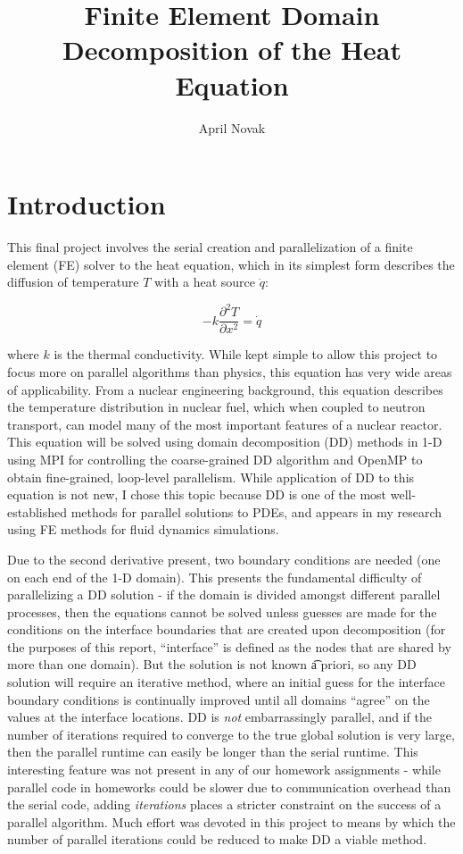 \documentclass[10pt]{article}
\title{Finite Element Domain Decomposition of the Heat Equation}
\author{April Novak}
\newcommand{\beq}{\begin{equation}}
\newcommand{\eeq}{\end{equation}}
\begin{document}
\maketitle

\section{Introduction}

This final project involves the serial creation and parallelization of a finite element (FE) solver to the heat equation, which in its simplest form describes the diffusion of temperature \(T\) with a heat source \(\dot{q}\):

\beq
\label{eq:eq}
-k\frac{\partial^2 T}{\partial x^2}=\dot{q}
\eeq

where \(k\) is the thermal conductivity. While kept simple to allow this project to focus more on parallel algorithms than physics, this equation has very wide areas of applicability. From a nuclear engineering background, this equation describes the temperature distribution in nuclear fuel, which when coupled to neutron transport, can model many of the most important features of a nuclear reactor. This equation will be solved using domain decomposition (DD) methods in 1-D using MPI for controlling the coarse-grained DD algorithm and OpenMP to obtain fine-grained, loop-level parallelism. While application of DD to this equation is not new, I chose this topic because DD is one of the most well-established methods for parallel solutions to PDEs, and appears in my research using FE methods for fluid dynamics simulations.

Due to the second derivative present, two boundary conditions are needed (one on each end of the 1-D domain). This presents the fundamental difficulty of parallelizing a DD solution - if the domain is divided amongst different parallel processes, then the equations cannot be solved unless guesses are made for the conditions on the interface boundaries that are created upon decomposition (for the purposes of this report, ``interface'' is defined as the nodes that are shared by more than one domain). But the solution is not known {\t a priori}, so any DD solution will require an iterative method, where an initial guess for the interface boundary conditions is continually improved until all domains ``agree'' on the values at the interface locations. DD is \textit{not} embarrassingly parallel, and if the number of iterations required to converge to the true global solution is very large, then the parallel runtime can easily be longer than the serial runtime. This interesting feature was not present in any of our homework assignments - while parallel code in homeworks could be slower due to communication overhead than the serial code, adding {\it iterations} places a stricter constraint on the success of a parallel algorithm. Much effort was devoted in this project to means by which the number of parallel iterations could be reduced to make DD a viable method.
\end{document}
